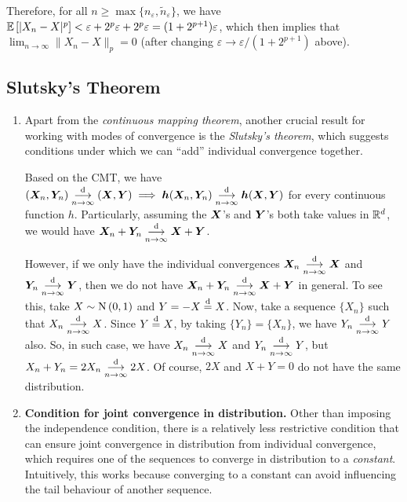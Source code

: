 \begin{enumerate}
\begin{pf}
Therefore, for all \(n\ge\max\{n_{\varepsilon},\widetilde{n}_{\varepsilon}\}\),
we have \(\mathbb{E}\left[|X_n-X|^{p}\right]<\varepsilon+2^p\varepsilon+2^p
\varepsilon=(1+2^{p+1})\varepsilon\), which then implies that
\(\lim_{n\to\infty}\|X_n-X\|_{p}=0\) (after changing
\(\varepsilon\to\varepsilon/(1+2^{p+1})\) above).
\end{pf}
\end{enumerate}
\subsection{Slutsky's Theorem}
\begin{enumerate}
\item Apart from the \emph{continuous mapping theorem}, another crucial result
for working with modes of convergence is the \emph{Slutsky's theorem}, which
suggests conditions under which we can ``add'' individual convergence together.

Based on the CMT, we have \((\bm{X}_n,\bm{Y}_n)\underset{n\to\infty}{\overset{\text{d}}{\longrightarrow}} (\bm{X},\bm{Y})\implies 
\bm{h}(\bm{X}_n,\bm{Y}_n)\underset{n\to\infty}{\overset{\text{d}}{\longrightarrow}} \bm{h}(\bm{X},\bm{Y})\) for every
continuous function \(h\). Particularly, assuming the \(\bm{X}\)'s and
\(\bm{Y}\)'s both take values in \(\mathbb{R}^d\), we would have
\(\bm{X}_n+\bm{Y}_n\underset{n\to\infty}{\overset{\text{d}}{\longrightarrow}} \bm{X}+\bm{Y}\).

However, if we only have the individual convergences \(\bm{X}_n\underset{n\to\infty}{\overset{\text{d}}{\longrightarrow}}
\bm{X}\) and \(\bm{Y}_n\underset{n\to\infty}{\overset{\text{d}}{\longrightarrow}} \bm{Y}\), then we do not have
\(\bm{X}_n+\bm{Y}_n\underset{n\to\infty}{\overset{\text{d}}{\longrightarrow}} \bm{X}+\bm{Y}\) in general. To see this,
take \(X\sim\operatorname{N}\left(0,1\right)\) and \(Y=-X\overset{\text{d}}= X\). Now, take a sequence \(\{X_n\}\)
such that \(X_n\underset{n\to\infty}{\overset{\text{d}}{\longrightarrow}} X\). Since \(Y\overset{\text{d}}= X\), by taking \(\{Y_n\}=\{X_n\}\),
we have \(Y_n\underset{n\to\infty}{\overset{\text{d}}{\longrightarrow}} Y\) also. So, in such case, we have \(X_n\underset{n\to\infty}{\overset{\text{d}}{\longrightarrow}} X\) and \(Y_n\underset{n\to\infty}{\overset{\text{d}}{\longrightarrow}} Y\),
but \(X_n+Y_n=2X_n\underset{n\to\infty}{\overset{\text{d}}{\longrightarrow}} 2X\). Of course, \(2X\) and \(X+Y=0\) do not have the
same distribution.
\item \textbf{Condition for joint convergence in distribution.}
Other than imposing the independence condition, there is a relatively less
restrictive condition that can ensure joint convergence in distribution from
individual convergence, which requires one of the sequences to converge in
distribution to a \emph{constant}. Intuitively, this works because converging
to a constant can avoid influencing the tail behaviour of another sequence.


\end{enumerate}
